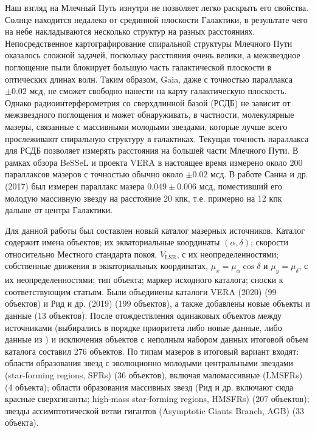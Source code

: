 \documentclass[a4paper, oneside, 14pt]{article}
\begin{document}
Наш взгляд на Млечный Путь изнутри не позволяет легко раскрыть его свойства. Солнце находится недалеко от срединной плоскости Галактики, в результате чего на небе накладываются несколько структур на разных расстояниях. Непосредственное картографирование спиральной структуры Млечного Пути оказалось сложной задачей, поскольку расстояния очень велики, а межзвездное поглощение пыли блокирует большую часть галактической плоскости в оптических длинах волн. Таким образом, Gaia, даже с точностью параллакса $ \pm 0.02 $ мсд, не сможет свободно нанести на карту галактическую плоскость. Однако радиоинтерферометрия со сверхдлинной базой (РСДБ) не зависит от межзвездного поглощения и может обнаруживать, в частности, молекулярные мазеры, связанные с массивными молодыми звездами, которые лучше всего прослеживают спиральную структуру в галактиках. Текущая точность параллакса для РСДБ позволяет измерять расстояния на большей части Млечного Пути. В рамках обзора BeSSeL \cite{BeSSeL} и проекта VERA \cite{VERA.2020} в настоящее время измерено около 200 параллаксов мазеров с точностью обычно около $ \pm 0.02 $ мсд. В работе Санна и др. (2017) \cite{S.2017} был измерен параллакс мазера $ 0.049 \pm 0.006 $ мсд, поместивший его молодую массивную звезду на расстояние 20 кпк, т.е. примерно на 12 кпк дальше от центра Галактики.

Для данной работы был составлен новый каталог мазерных источников. Каталог содержит имена объектов; их экваториальные координаты $ (\alpha, \delta) $; скорости относительно Местного стандарта покоя, $ V_\text{LSR} $, с их неопределенностями; собственные движения в экваториальных координатах, $ \mu_x = \mu_\alpha \cos{\delta} $ и $ \mu_y = \mu_\delta $, с их неопределенностями; тип объекта; маркер исходного каталога; сноски к соответствующим статьям. Были объединены каталоги VERA (2020) \cite{VERA.2020} (99 объектов) и Рид и др. (2019) \cite{R.2019} (199 объектов), а также добавлены новые объекты и данные (13 объектов). После отождествления одинаковых объектов между источниками (выбирались в порядке приоритета либо новые данные, либо данные из \cite{R.2019}) и исключения объектов с неполным набором данных итоговой объем каталога составил 276 объектов. По типам мазеров в итоговый вариант входят: области образования звезд с эволюционно молодыми центральными звездами (star-forming regions, SFRs) (36 объектов), включая маломассивные (LMSFRs) (4 объекта); области образования массивных звезд (Рид и др. включают сюда красные сверхгиганты; high-mass star-forming regions, HMSFRs) (207 объектов); звезды ассимптотической ветви гигантов (Asymptotic Giants Branch, AGB) (33 объекта).
\end{document}
